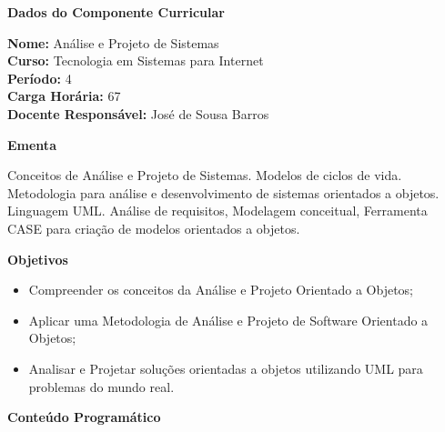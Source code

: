 

\begin{snugshade}\begin{center}\textbf{
	Dados do Componente Curricular
}\end{center}\end{snugshade}

\noindent 	\textbf{Nome:} Análise e Projeto de Sistemas
\\ 			\textbf{Curso:} Tecnologia em Sistemas para Internet
\\ 			\textbf{Período:} \unit{4}{\degree}
\\ 			\textbf{Carga Horária:} \unit{67}{\hour}
\\ 			\textbf{Docente Responsável:} José de Sousa Barros 


\begin{snugshade}\begin{center}\textbf{
    Ementa
\vphantom{q}}\end{center}\end{snugshade}

\noindent
Conceitos de Análise e Projeto de Sistemas. Modelos de ciclos de vida.  Metodologia para análise e desenvolvimento de sistemas orientados a objetos. Linguagem UML.  Análise de requisitos, Modelagem conceitual, Ferramenta CASE para criação de modelos orientados a objetos.


\begin{snugshade}\begin{center}\textbf{
    Objetivos
}\end{center}\end{snugshade}


\begin{itemize}

\item Compreender os conceitos da Análise e Projeto Orientado a Objetos;
\item Aplicar uma Metodologia de Análise e Projeto de Software Orientado a Objetos;
\item Analisar e Projetar soluções orientadas a objetos utilizando UML para problemas do mundo real.

\end{itemize} 


\begin{snugshade}\begin{center}\textbf{
    Conteúdo Programático
}\end{center}\end{snugshade}

